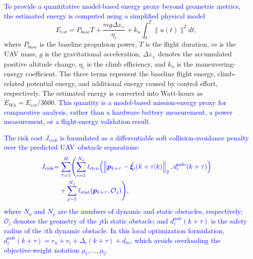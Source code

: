 \documentclass[lettersize,journal]{IEEEtran}
\newcommand{\vect}[1]{\boldsymbol{#1}}
\begin{document}
\textcolor{blue}{To provide a quantitative model-based energy proxy beyond geometric metrics, the estimated energy is computed using a simplified physical model}
\begin{equation}
	E_{est}=P_{base}T+\frac{m g \Delta z_+}{\eta_c}+k_u\int_0^T \|u(t)\|^2 dt,
	\label{eq:estimated_energy}
\end{equation}
where $P_{base}$ is the baseline propulsion power, $T$ is the flight duration, $m$ is the UAV mass, $g$ is the gravitational acceleration, $\Delta z_+$ denotes the accumulated positive altitude change, $\eta_c$ is the climb efficiency, and $k_u$ is the maneuvering-energy coefficient. The three terms represent the baseline flight energy, climb-related potential energy, and additional energy caused by control effort, respectively. The estimated energy is converted into Watt-hours as $E_{Wh}=E_{est}/3600$. \textcolor{blue}{This quantity is a model-based mission-energy proxy for comparative analysis, rather than a hardware battery measurement, a power measurement, or a flight-energy validation result.}

\textcolor{blue}{The risk cost $J_{risk}$ is formulated as a differentiable soft collision-avoidance penalty over the predicted UAV--obstacle separations:}
\begin{equation}
	\begin{aligned}
		\textcolor{blue}{J_{\text{risk}}} &\textcolor{blue}{= \sum_{\tau=1}^{H} \Biggl(\sum_{i=1}^{N_o} \ell_{\mathrm{dyn}}\!\left(\left\|\vect{p}_{k+\tau}-\hat{\vect{\xi}}_i(k+\tau|k)\right\|_2,d^{\mathrm{safe}}_i(k+\tau)\right)} \\
		&\textcolor{blue}{\quad + \sum_{j=1}^{N_s} \ell_{\mathrm{stat}}\!\left(\vect{p}_{k+\tau},\mathcal{O}_j\right)\Biggr),}
	\end{aligned}
	\label{eq:jrisk}
\end{equation}
\textcolor{blue}{where $N_o$ and $N_s$ are the numbers of dynamic and static obstacles, respectively; $\mathcal{O}_j$ denotes the geometry of the $j$th static obstacle; and $d^{\mathrm{safe}}_i(k+\tau)$ is the safety radius of the $i$th dynamic obstacle. In this local optimization formulation, $d^{\mathrm{safe}}_i(k+\tau)=r_u+r_i+\Delta_i(k+\tau)+d_m$, which avoids overloading the objective-weight notation $\rho_1,\ldots,\rho_5$.}
\end{document}
